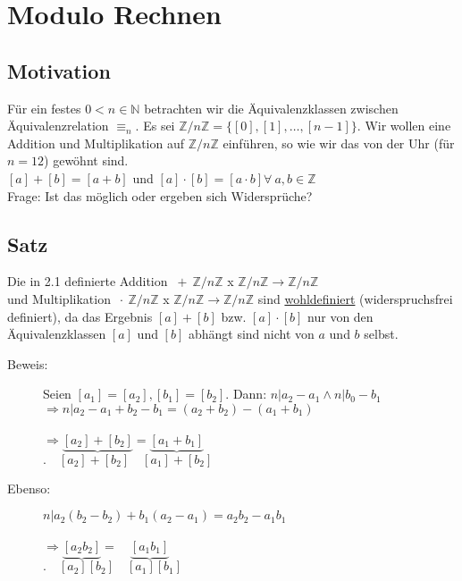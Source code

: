 \section{Modulo Rechnen}
%
%
%
\subsection{Motivation}
Für ein festes $0 < n \in \mathbb{N}$ betrachten wir die Äquivalenzklassen zwischen Äquivalenzrelation $\equiv_{n}$. Es sei $\mathbb{Z}/n\mathbb{Z} = \{ [0], [1], \dotsc, [n-1]\}$. Wir wollen eine Addition und Multiplikation auf $\mathbb{Z}/n\mathbb{Z}$ einführen, so wie wir das von der Uhr (für $n=12$) gewöhnt sind. \\
$[a]+[b]=[a+b]$ und $[a] \cdot [b] = [a \cdot b] \forall \ a,b \in \mathbb{Z}$\\
Frage: Ist das möglich oder ergeben sich Widersprüche?
%
%
%
\subsection{Satz}
Die in 2.1 definierte Addition $ \ + \ \mathbb{Z}/n\mathbb{Z}$ x $\mathbb{Z}/n\mathbb{Z} \rightarrow \mathbb{Z}/n\mathbb{Z}$\\
und Multiplikation $ \ \cdot \ \mathbb{Z}/n\mathbb{Z}$ x $\mathbb{Z}/n\mathbb{Z} \rightarrow \mathbb{Z}/n\mathbb{Z}$ sind \underline{wohldefiniert} (widerspruchsfrei definiert), da das Ergebnis $[a] + [b]$ bzw. $[a] \cdot [b]$ nur von den Äquivalenzklassen $[a]$ und $[b]$ abhängt sind nicht von $a$ und $b$ selbst. 
\begin{description}
	\item[Beweis:] Seien $[a_{1}]  = [a_{2}], [b_{1}] = [b_{2}]$. Dann: $n|a_{2} - a_{1} \wedge n|b_{0} - b_{1}$\\
			$\Rightarrow n| a_{2} - a_{1} + b_{2} - b_{1} = (a_{2} + b_{2}) - (a_{1} + b_{1})$\\
			\quad \\
			$ \Rightarrow \underbrace{[a_{2}]+[b_{2}]} = \underbrace{[a_{1}+b_{1}]}$\\
			$. \quad [a_{2}] + [b_{2}] \quad [a_{1}] + [b_{2}]$
	\item[Ebenso:] $n| a_{2}(b_{2} - b_{2}) + b_{1}(a_{2} - a_{1}) = a_{2}b_{2} - a_{1}b_{1}$\\
				\quad\\
				$\Rightarrow \underbrace{[a_{2}b_{2}]} = \quad \underbrace{[a_{1}b_{1}]}$\\
				$. \quad [a_{2}][b_{2}] \quad [a_{1}][b_{1}]$
\end{description}
%
%
%
